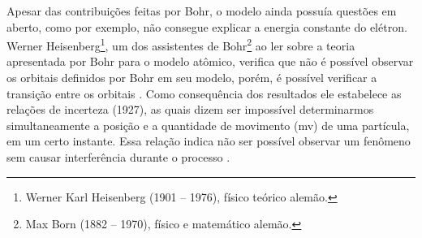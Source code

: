 
Apesar das contribuições feitas por Bohr, o modelo ainda possuía questões em aberto, como por exemplo, não consegue explicar a energia constante do elétron. Werner Heisenberg\footnote{Werner Karl Heisenberg (1901 -- 1976), físico teórico alemão.}, um dos assistentes de Bohr\footnote{Max Born (1882 -- 1970), físico e matemático alemão.} ao ler sobre a teoria apresentada por Bohr para o modelo atômico, verifica que não é possível observar os orbitais definidos por Bohr em seu modelo, porém, é possível verificar a transição entre os orbitais \cite{book:rocha2002}. Como consequência dos resultados ele estabelece as relações de incerteza (1927), as quais dizem ser impossível determinarmos simultaneamente a posição e a quantidade de movimento (mv) de uma partícula, em um certo instante. Essa relação indica não ser possível observar um fenômeno sem causar interferência durante o processo \cite{book:pinheiro2011, book:Oliveira2006, melzer2015}.


